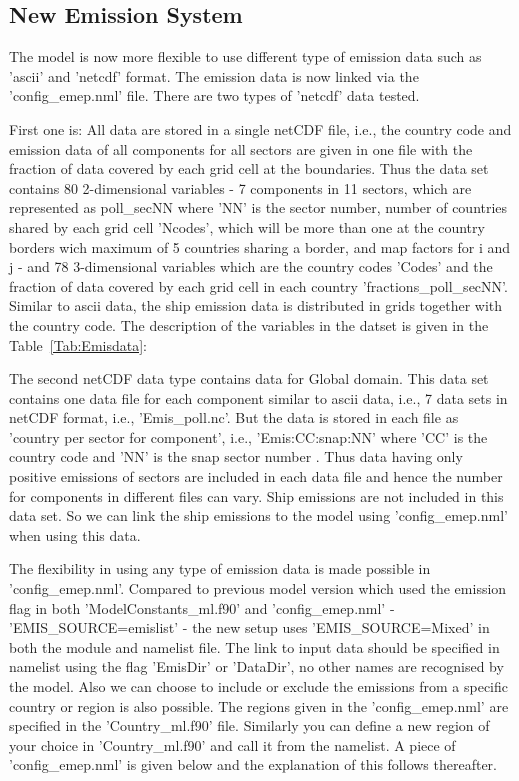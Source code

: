 \subsection{New Emission System}

The model is now more flexible to use different type of emission data such as 'ascii' and 'netcdf' format.  The emission data is now linked via the 'config\_emep.nml' file.  There are two types of 'netcdf' data tested.  

First one is:  All data are stored in a single netCDF file, i.e., the country code and emission data of all components for all sectors are given in one file with the fraction of data covered by each grid cell at the boundaries. Thus the data set contains 80 2-dimensional variables - 7 components in 11 sectors, which are represented as poll\_secNN where 'NN' is the sector number, number of countries shared by each grid cell 'Ncodes', which will be more than one at the country borders wich maximum of 5 countries sharing a border, and map factors for i and j - and 78 3-dimensional variables which are the country codes 'Codes' and the fraction of data covered by each grid cell in each country 'fractions\_poll\_secNN'.  Similar to ascii data, the ship emission data is distributed in grids together with the country code.  The description of the variables in the datset is given in the Table~\ref{Tab:Emisdata}: 

The second netCDF data type contains data for Global domain.  This data set contains one data file for each component similar to ascii data, i.e., 7 data sets in netCDF format, i.e., 'Emis\_poll.nc'.  But the data is stored in each file as 'country per sector for component', i.e., 'Emis:CC:snap:NN' where 'CC' is the country code and 'NN' is the snap sector number .  Thus data having only positive emissions of sectors are included in each data file and hence the number for components in different files can vary.  Ship emissions are not included in this data set.  So we can link the ship emissions to the model using 'config\_emep.nml' when using this data.  

The flexibility in using any type of emission data is made possible in 'config\_emep.nml'.  Compared to previous model version which used the emission flag in both 'ModelConstants\_ml.f90' and 'config\_emep.nml' - 'EMIS\_SOURCE=emislist' - the new setup uses 'EMIS\_SOURCE=Mixed' in both the module and namelist file.  The link to input data should be specified in namelist using the flag 'EmisDir' or 'DataDir', no other names are recognised by the model.  Also we can choose to include or exclude the emissions from a specific country or region is also possible. The regions given in the 'config\_emep.nml' are specified in the 'Country\_ml.f90' file.  Similarly you can define a new region of your choice in 'Country\_ml.f90' and call it from the namelist.   A piece of 'config\_emep.nml' is given below and the explanation of this follows thereafter.  


